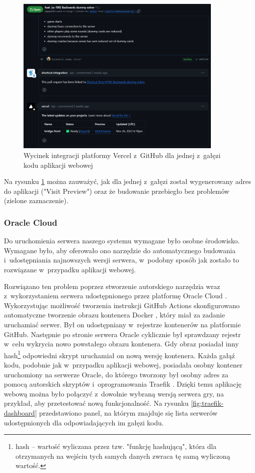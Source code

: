 \begin{figure}[hbt!]
    \centering
    \includegraphics[width=0.9\textwidth]{img/github/github-vercel.png}
    \caption{Wycinek integracji platformy Vercel z~GitHub dla jednej z~gałęzi kodu aplikacji webowej}
    \label{fig:github-vercel}
\end{figure}

Na rysunku
\ref{fig:github-vercel} można zauważyć, jak dla jednej
z~gałęzi został wygenerowany adres do aplikacji
("Visit Preview") oraz że budowanie przebiegło bez problemów
(zielone zaznaczenie).

\FloatBarrier


\subsubsection{Oracle Cloud}

Do uruchomienia serwera naszego systemu wymagane było
osobne środowisko. Wymagane było, aby oferowało ono
narzędzie do automatycznego budowania i~udostępniania
najnowszych wersji serwera, w~podobny sposób jak zostało
to rozwiązane w~przypadku aplikacji webowej.

Rozwiązano ten problem poprzez stworzenie autorskiego
narzędzia wraz z~wykorzystaniem serwera udostępnionego
przez platformę Oracle Cloud \cite{OracleCloud}.
Wykorzystując możliwość tworzenia instrukcji GitHub Actions
skonfigurowano automatyczne tworzenie obrazu kontenera
Docker \cite{Docker}, który miał za zadanie uruchamiać
serwer. Był on udostępniany w~rejestrze kontenerów na
platformie GitHub. Następnie po stronie serwera Oracle
cyklicznie był sprawdzany rejestr w~celu wykrycia
nowo powstałego obrazu kontenera. Gdy obraz posiadał
inny hash\footnote{hash -- wartość wyliczana przez tzw. "funkcję
    hashującą", która dla otrzymanych na wejściu tych
    samych danych zwraca tę samą wyliczoną wartość.}
odpowiedni skrypt uruchamiał on nową wersję kontenera.
Każda gałąź kodu, podobnie jak w~przypadku aplikacji
webowej, posiadała osobny kontener uruchomiony na serwerze
Oracle, do którego tworzony był osobny adres za pomocą
autorskich skryptów i~oprogramowania Traefik \cite{Traefik}.
Dzięki temu aplikację webową można było połączyć
z~dowolnie wybraną wersją serwera gry, na przykład, aby
przetestować nową funkcjonalność. Na rysunku
\ref{fig:traefik-dashboard} przedstawiono panel, na którym
znajduje się lista serwerów udostępnionych dla
odpowiadających im gałęzi kodu.

